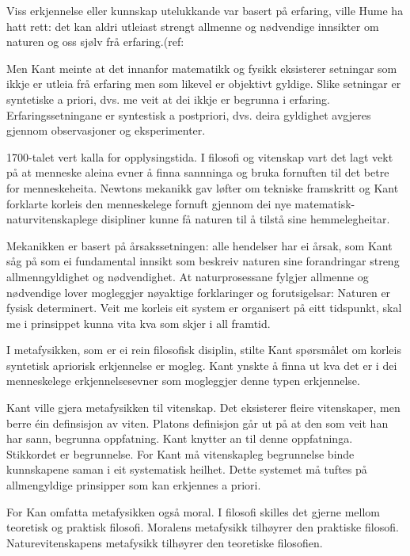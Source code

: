 \documentclass[a4paper]{IEEEtran}
\begin{document}
Viss erkjennelse eller kunnskap utelukkande var basert på erfaring, ville Hume ha hatt rett: det kan aldri utleiast strengt allmenne og nødvendige innsikter om naturen og oss sjølv frå erfaring.(ref:\bigskip

Men Kant meinte at det innanfor matematikk og fysikk eksisterer setningar som ikkje er utleia frå erfaring men som likevel er objektivt gyldige. Slike setningar er syntetiske a priori, dvs. me veit at dei ikkje er begrunna i erfaring. Erfaringssetningane er syntestisk a postpriori, dvs. deira gyldighet avgjeres gjennom observasjoner og eksperimenter.\bigskip

1700-talet vert kalla for opplysingstida. I filosofi og vitenskap vart det lagt vekt på at menneske aleina evner å finna sannninga og bruka fornuften til det betre for menneskeheita. Newtons mekanikk gav løfter om tekniske framskritt og Kant forklarte korleis den menneskelege fornuft gjennom dei nye matematisk-naturvitenskaplege disipliner kunne få naturen til å tilstå sine hemmelegheitar.\bigskip



Mekanikken er basert på årsakssetningen: alle hendelser har ei årsak, som Kant såg på som ei fundamental innsikt som beskreiv naturen sine forandringar streng allmenngyldighet og nødvendighet. At naturprosessane fylgjer allmenne og nødvendige lover mogleggjer nøyaktige forklaringer og forutsigelsar: Naturen er fysisk determinert. Veit me korleis eit system er organisert på eitt tidspunkt, skal me i prinsippet kunna vita kva som skjer i all framtid.\bigskip

I metafysikken, som er ei rein filosofisk disiplin, stilte Kant spørsmålet om korleis syntetisk apriorisk erkjennelse er mogleg. Kant ynskte å finna ut kva det er i dei menneskelege erkjennelsesevner som mogleggjer denne typen erkjennelse.\bigskip

Kant ville gjera metafysikken til vitenskap. Det eksisterer fleire vitenskaper, men berre éin definsisjon av viten. Platons definisjon går ut på at den som veit han har sann, begrunna oppfatning. Kant knytter an til denne oppfatninga. Stikkordet er begrunnelse. For Kant må vitenskapleg begrunnelse binde kunnskapene saman i eit systematisk heilhet. Dette systemet må tuftes på allmengyldige prinsipper som kan erkjennes a priori.\bigskip

For Kan omfatta metafysikken også moral. I filosofi skilles det gjerne mellom teoretisk og praktisk filosofi. Moralens metafysikk tilhøyrer den praktiske filosofi. Naturevitenskapens metafysikk tilhøyrer den teoretiske filosofien.\bigskip
\end{document}
